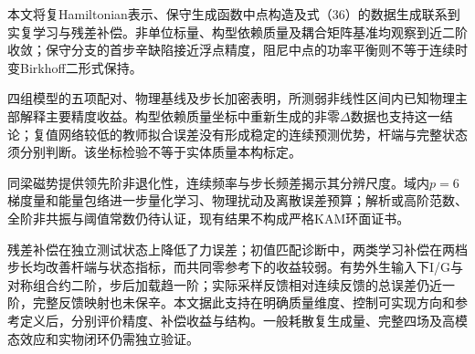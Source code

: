 本文将复Hamiltonian表示、保守生成函数中点构造及式（36）的数据生成联系到实复学习与残差补偿。非单位标量、构型依赖质量及耦合矩阵基准均观察到近二阶收敛；保守分支的首步辛缺陷接近浮点精度，阻尼中点的功率平衡则不等于连续时变Birkhoff二形式保持。

四组模型的五项配对、物理基线及步长加密表明，所测弱非线性区间内已知物理主部解释主要精度收益。构型依赖质量坐标中重新生成的非零$\Delta$数据也支持这一结论；复值网络较低的教师拟合误差没有形成稳定的连续预测优势，杆端与完整状态须分别判断。该坐标检验不等于实体质量本构标定。

同梁磁势提供领先阶非退化性，连续频率与步长频差揭示其分辨尺度。域内$p=6$梯度量和能量包络进一步量化学习、物理扰动及离散误差预算；解析或高阶范数、全阶非共振与阈值常数仍待认证，现有结果不构成严格KAM环面证书。

残差补偿在独立测试状态上降低了力误差；初值匹配诊断中，两类学习补偿在两档步长均改善杆端与状态指标，而共同零参考下的收益较弱。有势外生输入下I/G与对称组合约二阶，步后加载趋一阶；实际采样反馈相对连续反馈的总误差仍近一阶，完整反馈映射也未保辛。本文据此支持在明确质量维度、控制可实现方向和参考定义后，分别评价精度、补偿收益与结构。一般耗散复生成量、完整四场及高模态效应和实物闭环仍需独立验证。
